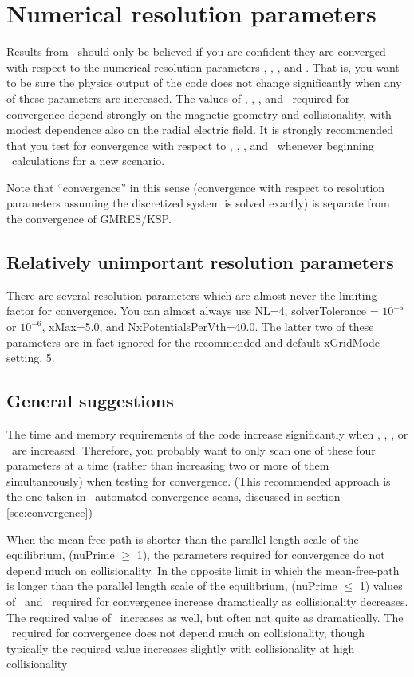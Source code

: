 \chapter{Numerical resolution parameters}

Results from \sfincs~should only be believed if you are confident they
are converged with respect to the numerical resolution parameters
\Ntheta, \Nzeta, \Nxi, and \Nx.  That is, you want to be sure the
physics output of the code does not change significantly when any of
these parameters are increased. The values of \Ntheta, \Nzeta, \Nxi,
and \Nx~required for convergence depend strongly on the magnetic
geometry and collisionality, with modest dependence also on the radial
electric field. It is strongly recommended that you test for
convergence with respect to \Ntheta, \Nzeta, \Nxi, and \Nx~whenever
beginning \sfincs~calculations for a new scenario.

Note that ``convergence'' in this sense (convergence with respect to resolution parameters assuming the discretized
system is solved exactly) is separate from the convergence of GMRES/KSP.

\section{Relatively unimportant resolution parameters}

There are several resolution parameters which are almost never the limiting factor
for convergence.  You can almost always use {\ttfamily NL=4}, 
{\ttfamily solverTolerance} = $10^{-5}$ or $10^{-6}$,
{\ttfamily xMax=5.0},
and {\ttfamily NxPotentialsPerVth=40.0}.  The latter two of these parameters are in fact ignored
for the recommended and default {\ttfamily xGridMode} setting, 5.

\section{General suggestions}

The time and memory requirements of the code increase significantly
when \Ntheta, \Nzeta, \Nxi, or \Nx~are increased. Therefore, you
probably want to only scan one of these four parameters at a time
(rather than increasing two or more of them simultaneously) when
testing for convergence. (This recommended approach is the one taken
in \sfincsScan~automated convergence scans, discussed in section
\ref{sec:convergence})

When the mean-free-path is shorter than the parallel length scale of the equilibrium,
({\ttfamily nuPrime} $\ge$ 1), the parameters required for convergence
do not depend much on collisionality. In the opposite
limit in which the mean-free-path is longer than the parallel length scale of the equilibrium,
({\ttfamily nuPrime} $\le$ 1)
values of
\Nzeta~and \Nxi~required for convergence increase dramatically
as collisionality decreases. The required value of \Ntheta~increases as well, but often
not quite as dramatically. The \Nx~required for convergence does not depend
much on collisionality, though typically the required value increases
slightly with collisionality at high collisionality

